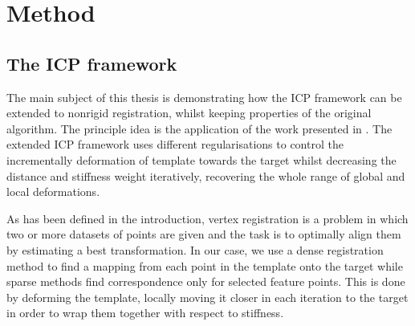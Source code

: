 \documentclass[../structure.tex]{subfiles}
\begin{document}
\chapter{Method}
\section{The ICP framework}
\hspace{2em}The main subject of this thesis is demonstrating how the ICP framework can be extended to nonrigid registration, whilst keeping properties of the original algorithm. The principle idea is the application of the work presented in \cite{Amberg2007}. The extended ICP framework uses different regularisations to control the incrementally deformation of template towards the target whilst decreasing the distance and stiffness weight iteratively, recovering the whole range of global and local deformations.
\begin{comment}
To reach the goal of finding the optimal alignment of the objects (graphs), iterative closest point algorithm is used. It search for each point in the template the nearest point in target, and to find the optimal deformation for a given stiffness, optimal iterative closest point steps are used. Preliminary correspondences are estimated by a nearest point search. Subsequently, the optimal deformation of the template for these fixed correspondences and the active stiffness is calculated. Afterwards, the process continues with new correspondences found by searching from the displaced template vertices. We present an algorithm using a locally affine regularisation which assigns an affine transformation to each vertex and minimises the difference in the transformation of neighbouring vertices. It is shown that for this regularisation, the optimal deformation for fixed correspondences and fixed stiffness can be determined exactly and efficiently. The method is successful for a wide range of initial conditions. Furthermore, it is compared qualitatively and quantitatively to other algorithms using synthetic examples and real world data.
\end{comment}

\hspace{2em}As has been defined in the introduction, vertex registration is a problem in which two or more datasets of points are given and the task is to optimally align them by estimating a best transformation. In our case, we use a dense registration method to find a mapping from each point in the template onto the target while sparse methods find correspondence only for selected feature points. This is done by deforming the template, locally moving it closer in each iteration to the target in order to wrap them together with respect to stiffness.
\end{document}
